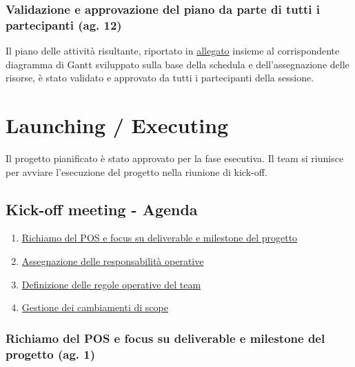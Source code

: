 \documentclass[11pt,a4paper]{article}
\providecommand{\tightlist}{\setlength{\itemsep}{0pt}\setlength{\parskip}{0pt}}
\begin{document}
\subsubsection{\texorpdfstring{{Validazione e approvazione del piano da parte di tutti i partecipanti (ag. 12)}}{Validazione e approvazione del piano da parte di tutti i partecipanti (ag. 12)}}\label{h.cle2qelgq5p7}

{Il piano delle attività risultante, riportato in \hyperref[sec:gantt]{allegato} insieme al corrispondente diagramma di Gantt sviluppato sulla base della schedula e dell’assegnazione delle risorse, è stato validato e approvato da tutti i partecipanti della sessione. }

{}

{}

\newpage

\section{Launching / Executing}\label{sec:launching}

{Il progetto pianificato è stato approvato per la fase esecutiva. Il team si riunisce per avviare l’esecuzione del progetto nella riunione di kick-off.}

\subsection{\texorpdfstring{{Kick-off meeting - Agenda}}{Kick-off meeting - Agenda}}\label{h.kafsa88zqzto}

\begin{enumerate}
\tightlist
\item
  \hyperref[h.iippzcy2doez]{Richiamo del POS e focus su deliverable e milestone del progetto}
\item
  \hyperref[h.h1flgr3hi6eb]{Assegnazione delle responsabilità operative}
\item
  \hyperref[h.a8mv01o13jnj]{Definizione delle regole operative del team}
\item
  \hyperref[h.erx0moktsty4]{Gestione dei cambiamenti di scope}
\end{enumerate}

\subsubsection{\texorpdfstring{{Richiamo del POS e focus su deliverable e milestone del progetto (ag. 1)}}{Richiamo del POS e focus su deliverable e milestone del progetto (ag. 1)}}\label{h.iippzcy2doez}
\end{document}

